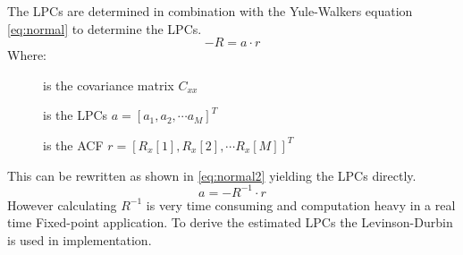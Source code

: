 The LPCs are determined in combination with the Yule-Walkers equation \autoref{eq:normal} to determine the LPCs.
\begin{equation}\label{eq:normal}
-R = a\cdot r
\end{equation}
Where:
\vspace{-8mm} %
\begin{description}
	\item[] is the covariance matrix $C_{xx}$
	\item[] is the LPCs $a = [a_1 , a_2, \cdots a_M]^T$
	\item[] is the ACF $r = [R_x[1] , R_x[2], \cdots R_x[M]]^T$
\end{description}
This can be rewritten as shown in \autoref{eq:normal2} yielding the LPCs directly.  
 \begin{equation}\label{eq:normal2}
a = -R^{-1}\cdot r
\end{equation}
However calculating $R^{-1}$ is very time consuming and computation heavy in a real time Fixed-point application. To derive the estimated LPCs the Levinson-Durbin is used in implementation.



